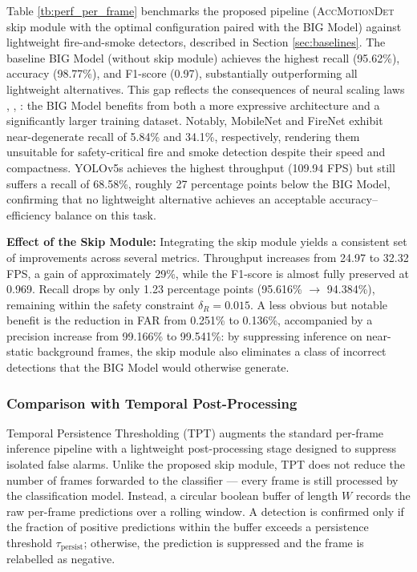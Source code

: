 \documentclass[
  10pt,
]{article}
\begin{document}
Table \ref{tb:perf_per_frame} benchmarks the proposed pipeline
(\textsc{AccMotionDet} skip module with the optimal configuration paired
with the BIG Model) against lightweight fire-and-smoke detectors,
described in Section \ref{sec:baselines}. The baseline BIG Model
(without skip module) achieves the highest recall (95.62\%), accuracy
(98.77\%), and F1-score (0.97), substantially outperforming all
lightweight alternatives. This gap reflects the consequences of neural
scaling laws ,
,
: the BIG Model benefits
from both a more expressive architecture and a significantly larger
training dataset. Notably, MobileNet and FireNet exhibit near-degenerate
recall of 5.84\% and 34.1\%, respectively, rendering them unsuitable for
safety-critical fire and smoke detection despite their speed and
compactness. YOLOv5s achieves the highest throughput (109.94 FPS) but
still suffers a recall of 68.58\%, roughly 27 percentage points below
the BIG Model, confirming that no lightweight alternative achieves an
acceptable accuracy--efficiency balance on this task.

\textbf{Effect of the Skip Module:} Integrating the skip module yields a
consistent set of improvements across several metrics. Throughput
increases from 24.97 to 32.32 FPS, a gain of approximately 29\%, while
the F1-score is almost fully preserved at 0.969. Recall drops by only
1.23 percentage points (95.616\% \(\to\) 94.384\%), remaining within the
safety constraint \(\delta_R = 0.015\). A less obvious but notable
benefit is the reduction in FAR from 0.251\% to 0.136\%, accompanied by
a precision increase from 99.166\% to 99.541\%: by suppressing inference
on near-static background frames, the skip module also eliminates a
class of incorrect detections that the BIG Model would otherwise
generate.

\subsubsection{Comparison with Temporal
Post-Processing}\label{sec:cmp-temporal}

Temporal Persistence Thresholding (TPT)
 augments the standard per-frame
inference pipeline with a lightweight post-processing stage designed to
suppress isolated false alarms. Unlike the proposed skip module, TPT
does not reduce the number of frames forwarded to the classifier ---
every frame is still processed by the classification model. Instead, a
circular boolean buffer of length \(W\) records the raw per-frame
predictions over a rolling window. A detection is confirmed only if the
fraction of positive predictions within the buffer exceeds a persistence
threshold \(\tau_\text{persist}\); otherwise, the prediction is
suppressed and the frame is relabelled as negative.
\end{document}
